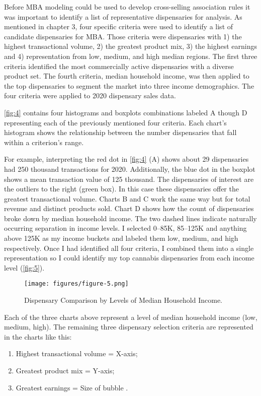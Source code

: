 \documentclass[../article.tex, 12pt]{subfiles}
\begin{document}
\begin{multicols*}{2}
Before MBA modeling could be used to develop cross-selling association rules it was important to identify a list of representative dispensaries for analysis. As mentioned in chapter 3, four specific criteria were used to identify a list of candidate dispensaries for MBA. Those criteria were dispensaries with 1) the highest transactional volume, 2) the greatest product mix, 3) the highest earnings and 4) representation from low, medium, and high median regions. The first three criteria identified the most commercially active dispensaries with a diverse product set. The fourth criteria, median household income, was then applied to the top dispensaries to segment the market into three income demographics. The four criteria were applied to 2020 dispensary sales data.

\par
\autoref{fig:4} contains four histograms and boxplots combinations labeled A though D representing each of the previously mentioned four criteria. Each chart's histogram shows the relationship between the number dispensaries that fall within a criterion's range.

\par
For example, interpreting the red dot in \autoref{fig:4} (A) shows about 29 dispensaries had 250 thousand transactions for 2020. Additionally, the blue dot in the boxplot shows a mean transaction value of 125 thousand. The dispensaries of interest are the outliers to the right (green box). In this case these dispensaries offer the greatest transactional volume. Charts B and C work the same way but for total revenue and distinct products sold. Chart D shows how the count of dispensaries broke down by median household income. The two dashed lines indicate naturally occurring separation in income levels. I selected 0--85K, 85--125K and anything above 125K as my income buckets and labeled them low, medium, and high respectively. Once I had identified all four criteria, I combined them into a single representation so I could identify my top cannabis dispensaries from each income level (\autoref{fig:5}).

\begin{figure*}
\texttt{[image: figures/figure-5.png]}
\captionsetup{margin=.1\linewidth}
\caption{Dispensary Comparison by Levels of Median Household Income.}
\label{fig:5}
\end{figure*}

\par
Each of the three charts above represent a level of median household income (low, medium, high). The remaining three dispensary selection criteria are represented in the charts like this:
\begin{enumerate}
\item Highest transactional volume = X-axis;
\item Greatest product mix = Y-axis;
\item Greatest earnings = Size of bubble .
\end{enumerate}


\end{multicols*}
\end{document}
